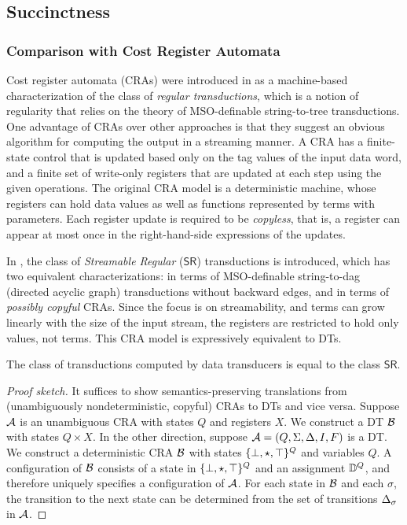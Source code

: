 \subsection{Succinctness}
\label{dt:sec:succinctness}

\subsubsection{Comparison with Cost Register Automata}
\label{dt:subsec:dts-and-cras}

\newcommand{\SR}{\mathsf{SR}}

Cost register automata (CRAs) were introduced in \cite{AdADRY2013CRA} as a machine-based characterization of the class of \emph{regular transductions}, which is a notion of regularity that relies on the theory of MSO-definable string-to-tree transductions. One advantage of CRAs over other approaches is that they suggest an obvious algorithm for computing the output in a streaming manner. A CRA has a finite-state control that is updated based only on the tag values of the input data word, and a finite set of write-only registers that are updated at each step using the given operations. The original CRA model is a deterministic machine, whose registers can hold data values as well as functions represented by terms with parameters. Each register update is required to be \emph{copyless}, that is, a register can appear at most once
in the right-hand-side expressions of the updates.

In \cite{arXiv2018}, the class of \emph{Streamable Regular} ($\SR$) transductions is introduced, which has two equivalent characterizations: in terms of MSO-definable string-to-dag (directed acyclic graph) transductions without backward edges, and in terms of \emph{possibly copyful} CRAs. Since the focus is on streamability, and terms can grow linearly with the size of the input stream, the registers are restricted to hold only values, not terms. This CRA model is expressively equivalent to DTs.

\begin{theorem}
\label{dt:thm:dt-expressiveness}
The class of transductions computed by data transducers is equal to the class $\SR$.
\end{theorem}
\begin{proof}[Proof sketch]
It suffices to show semantics-preserving translations from (unambiguously nondeterministic, copyful) CRAs to DTs and vice versa. Suppose $\mathcal{A}$ is an unambiguous CRA with states $Q$ and registers $X$. We construct a DT $\mathcal{B}$ with states $Q \times X$. In the other direction, suppose $\mathcal{A} = (Q, \Sigma, \Delta, I, F)$ is a DT. We construct a deterministic CRA $\mathcal{B}$ with states $\{\bot,\star,\top\}^Q$ and variables $Q$. A configuration of $\mathcal{B}$ consists of a state in $\{\bot,\star,\top\}^Q$ and an assignment $\mathbb{D}^Q$, and therefore uniquely specifies a configuration of $\mathcal{A}$. For each state in $\mathcal{B}$ and each $\sigma$, the transition to the next state can be determined from the set of transitions $\Delta_\sigma$ in $\mathcal{A}$.
\end{proof}

